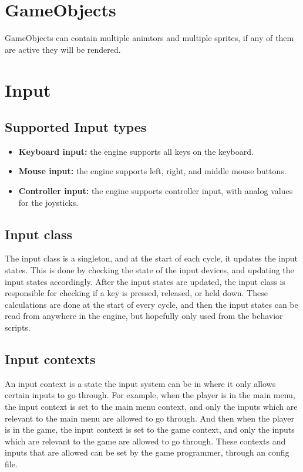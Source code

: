 \documentclass[draft]{article}
\begin{document}
\section{GameObjects}
GameObjects can contain multiple animtors and multiple sprites, if any of them are active they will be rendered.


\section{Input}
\subsection{Supported Input types}
\begin{itemize}
  \item \textbf{Keyboard input:} the engine supports all keys on the keyboard.
  \item \textbf{Mouse input:} the engine supports left, right, and middle mouse buttons.
  \item \textbf{Controller input:} the engine supports controller input, with analog values for the joysticks.
\end{itemize}
    
\subsection{Input class}
The input class is a singleton, and at the start of each cycle, it updates the input states.
This is done by checking the state of the input devices, and updating the input states accordingly.
After the input states are updated, the input class is responsible for checking if a key is pressed, released, or held down.
These calculations are done at the start of every cycle, and then the input states can be read from anywhere in the engine, but hopefully only used from the behavior scripts.

\subsection{Input contexts}
An input context is a state the input system can be in where it only allows certain inputs to go through.
For example, when the player is in the main menu, the input context is set to the main menu context, and only the inputs which are relevant to the main menu are allowed to go through.
And then when the player is in the game, the input context is set to the game context, and only the inputs which are relevant to the game are allowed to go through.
These contexts and inputs that are allowed can be set by the game programmer, through an config file.
\end{document}
